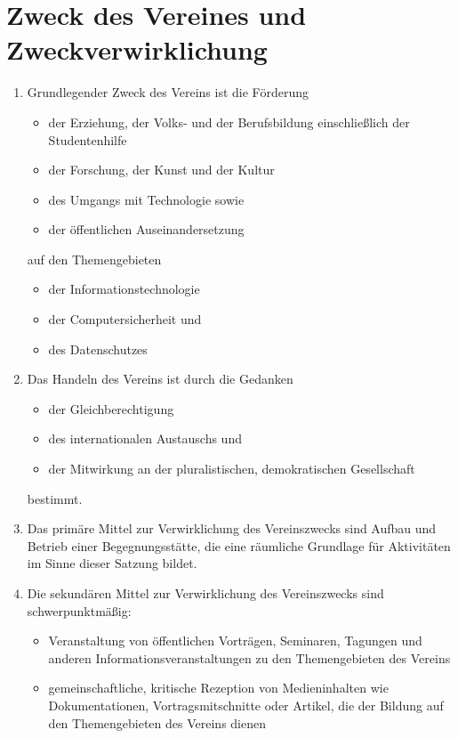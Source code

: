 \documentclass[fontsize=12pt,paper=a4,pagesize]{scrartcl}
\begin{document}
\section{Zweck des Vereines und Zweckverwirklichung}
\begin{enumerate}
	\item Grundlegender Zweck des Vereins ist die Förderung
		\begin{itemize}
			\item der Erziehung, der Volks- und der Berufsbildung einschließlich
				  der Studentenhilfe
			\item der Forschung, der Kunst und der Kultur
			\item des Umgangs mit Technologie sowie
			\item der öffentlichen Auseinandersetzung
		\end{itemize}
		auf den Themengebieten
		\begin{itemize}
			\item der Informationstechnologie
			\item der Computersicherheit und
			\item des Datenschutzes
		\end{itemize}

	\item Das Handeln des Vereins ist durch die Gedanken
		\begin{itemize}
			\item der Gleichberechtigung
			\item des internationalen Austauschs und
			\item der Mitwirkung an der pluralistischen, demokratischen
				Gesellschaft
		\end{itemize}
		bestimmt.

	\item Das primäre Mittel zur Verwirklichung des Vereinszwecks sind
		Aufbau und Betrieb einer Begegnungsstätte, die eine räumliche
		Grundlage für Aktivitäten im Sinne dieser Satzung bildet.

	\item Die sekundären Mittel zur Verwirklichung des Vereinszwecks sind
		schwerpunktmäßig:

	\begin{itemize}
		\item Veranstaltung von öffentlichen Vorträgen, Seminaren, Tagungen und
			anderen Informationsveranstaltungen zu den Themengebieten
			des Vereins

		\item gemeinschaftliche, kritische Rezeption von Medieninhalten
			wie Dokumentationen, Vortragsmitschnitte oder Artikel, die der
			Bildung auf den Themengebieten des Vereins dienen


\end{itemize}
\end{enumerate}
\end{document}
